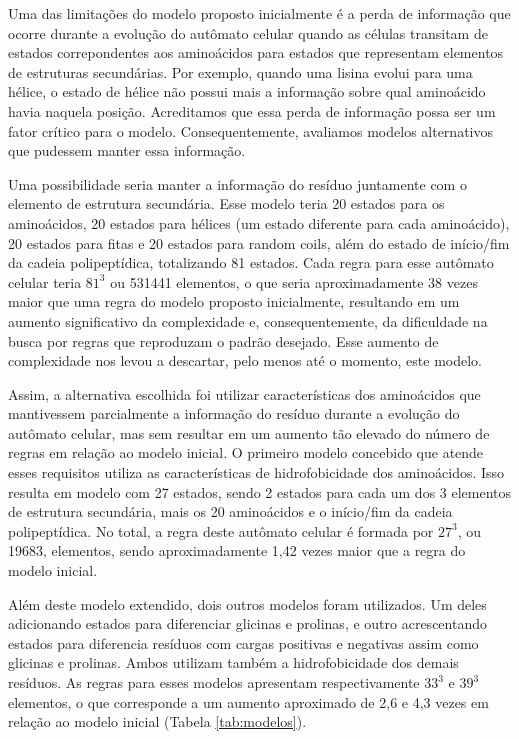 Uma das limitações do modelo proposto inicialmente é a perda de informação que ocorre durante a evolução do autômato celular quando as células transitam de estados correpondentes aos aminoácidos para estados que representam elementos de estruturas secundárias. Por exemplo, quando uma lisina evolui para uma hélice, o estado de hélice não possui mais a informação sobre qual aminoácido havia naquela posição. Acreditamos que essa perda de informação possa ser um fator crítico para o modelo. Consequentemente, avaliamos modelos alternativos que pudessem manter essa informação. 

Uma possibilidade seria manter a informação do resíduo juntamente com o elemento de estrutura secundária. Esse modelo teria 20 estados para os aminoácidos, 20 estados para hélices (um estado diferente para cada aminoácido), 20 estados para fitas e 20 estados para random coils, além do estado de início/fim da cadeia polipeptídica, totalizando 81 estados. Cada regra para esse autômato celular teria $81^3$  ou 531441 elementos, o que seria aproximadamente 38 vezes maior que uma regra do modelo proposto inicialmente, resultando em um aumento significativo da complexidade e, consequentemente, da dificuldade na busca por regras que reproduzam o padrão desejado. Esse aumento de complexidade nos levou a descartar, pelo menos até o momento, este modelo.

Assim, a alternativa escolhida foi utilizar características dos aminoácidos que mantivessem parcialmente a informação do resíduo durante a evolução do autômato celular, mas sem resultar em um aumento tão elevado do número de regras em relação ao modelo inicial. O primeiro modelo concebido que atende esses requisitos utiliza as características de hidrofobicidade dos aminoácidos. Isso resulta em modelo com 27 estados, sendo 2 estados para cada um dos 3 elementos de estrutura secundária, mais os 20 aminoácidos e o início/fim da cadeia polipeptídica. No total, a regra deste autômato celular é formada por  $27^3$, ou 19683, elementos, sendo aproximadamente 1,42 vezes maior que a regra do modelo inicial.

Além deste modelo extendido, dois outros modelos foram utilizados. Um deles adicionando estados para diferenciar glicinas e prolinas, e outro acrescentando estados para diferencia resíduos com cargas positivas e negativas assim como glicinas e prolinas. Ambos utilizam também a hidrofobicidade dos demais resíduos. As regras para esses modelos apresentam  respectivamente $33^3$ e $39^3$ elementos, o que corresponde a um aumento aproximado de 2,6 e 4,3 vezes em relação ao modelo inicial (Tabela \ref{tab:modelos}). 

